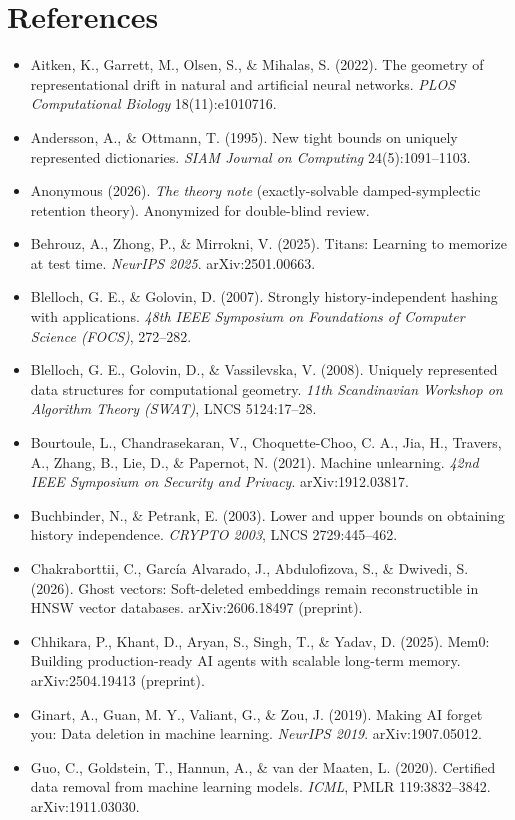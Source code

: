 \documentclass{article}
\begin{document}
\section*{References}
\begin{itemize}
\item Aitken, K., Garrett, M., Olsen, S., \& Mihalas, S. (2022). The geometry of representational drift in natural and artificial neural networks. \emph{PLOS Computational Biology} 18(11):e1010716.
\item Andersson, A., \& Ottmann, T. (1995). New tight bounds on uniquely represented dictionaries. \emph{SIAM Journal on Computing} 24(5):1091--1103.
\item Anonymous (2026). \emph{The theory note} (exactly-solvable damped-symplectic retention theory). Anonymized for double-blind review.
\item Behrouz, A., Zhong, P., \& Mirrokni, V. (2025). Titans: Learning to memorize at test time. \emph{NeurIPS 2025}. arXiv:2501.00663.
\item Blelloch, G. E., \& Golovin, D. (2007). Strongly history-independent hashing with applications. \emph{48th IEEE Symposium on Foundations of Computer Science (FOCS)}, 272--282.
\item Blelloch, G. E., Golovin, D., \& Vassilevska, V. (2008). Uniquely represented data structures for computational geometry. \emph{11th Scandinavian Workshop on Algorithm Theory (SWAT)}, LNCS 5124:17--28.
\item Bourtoule, L., Chandrasekaran, V., Choquette-Choo, C. A., Jia, H., Travers, A., Zhang, B., Lie, D., \& Papernot, N. (2021). Machine unlearning. \emph{42nd IEEE Symposium on Security and Privacy}. arXiv:1912.03817.
\item Buchbinder, N., \& Petrank, E. (2003). Lower and upper bounds on obtaining history independence. \emph{CRYPTO 2003}, LNCS 2729:445--462.
\item Chakraborttii, C., Garc\'ia Alvarado, J., Abdulofizova, S., \& Dwivedi, S. (2026). Ghost vectors: Soft-deleted embeddings remain reconstructible in HNSW vector databases. arXiv:2606.18497 (preprint).
\item Chhikara, P., Khant, D., Aryan, S., Singh, T., \& Yadav, D. (2025). Mem0: Building production-ready AI agents with scalable long-term memory. arXiv:2504.19413 (preprint).
\item Ginart, A., Guan, M. Y., Valiant, G., \& Zou, J. (2019). Making AI forget you: Data deletion in machine learning. \emph{NeurIPS 2019}. arXiv:1907.05012.
\item Guo, C., Goldstein, T., Hannun, A., \& van der Maaten, L. (2020). Certified data removal from machine learning models. \emph{ICML}, PMLR 119:3832--3842. arXiv:1911.03030.

\end{itemize}
\end{document}
